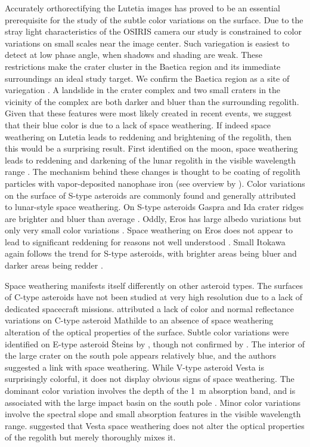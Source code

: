 \documentclass[3p,authoryear]{elsarticle}
\begin{document}
Accurately orthorectifying the Lutetia images has proved to be an essential prerequisite for the study of the subtle color variations on the surface. Due to the stray light characteristics of the OSIRIS camera our study is constrained to color variations on small scales near the image center. Such variegation is easiest to detect at low phase angle, when shadows and shading are weak. These restrictions make the crater cluster in the Baetica region and its immediate surroundings an ideal study target. We confirm the Baetica region as a site of variegation \citep{Mg12}. A landslide in the crater complex and two small craters in the vicinity of the complex are both darker and bluer than the surrounding regolith. Given that these features were most likely created in recent events, we suggest that their blue color is due to a lack of space weathering. If indeed space weathering on Lutetia leads to reddening and brightening of the regolith, then this would be a surprising result. First identified on the moon, space weathering leads to reddening and darkening of the lunar regolith in the visible wavelength range \citep{P93}. The mechanism behind these changes is thought to be coating of regolith particles with vapor-deposited nanophase iron (see overview by \citealt{C04}). Color variations on the surface of S-type asteroids are commonly found and generally attributed to lunar-style space weathering. On S-type asteroids Gaspra and Ida crater ridges are brighter and bluer than average \citep{H94,S96}. Oddly, Eros has large albedo variations but only very small color variations \citep{B02}. Space weathering on Eros does not appear to lead to significant reddening for reasons not well understood \citep{C04}. Small Itokawa again follows the trend for S-type asteroids, with brighter areas being bluer and darker areas being redder \citep{S06}.

Space weathering manifests itself differently on other asteroid types. The surfaces of C-type asteroids have not been studied at very high resolution due to a lack of dedicated spacecraft missions. \citet{C99} attributed a lack of color and normal reflectance variations on C-type asteroid Mathilde to an absence of space weathering alteration of the optical properties of the surface. Subtle color variations were identified on E-type asteroid {\v S}teins by \citet{S10}, though not confirmed by \citet{Le10}. The interior of the large crater on the south pole appears relatively blue, and the authors suggested a link with space weathering. While V-type asteroid Vesta is surprisingly colorful, it does not display obvious signs of space weathering. The dominant color variation involves the depth of the 1~\textmu m absorption band, and is associated with the large impact basin on the south pole \citep{R12}. Minor color variations involve the spectral slope and small absorption features in the visible wavelength range. \citet{Pi12} suggested that Vesta space weathering does not alter the optical properties of the regolith but merely thoroughly mixes it.
\end{document}
